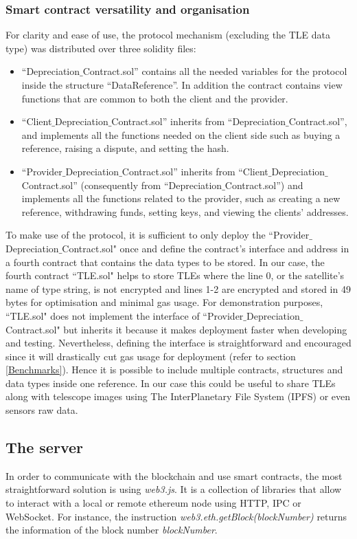 \documentclass[conference]{IEEEtran}
\begin{document}
\subsubsection{Smart contract versatility and organisation} 
For clarity and ease of use, the protocol mechanism (excluding the TLE data type) was distributed over three solidity files:
\begin{itemize}
    \item {``Depreciation$\_$Contract.sol'' contains all the needed variables for the protocol inside the structure ``DataReference''. In addition the contract contains view functions that are common to both the client and the provider.}
    \item {``Client$\_$Depreciation$\_$Contract.sol'' inherits from ``Depreciation$\_$Contract.sol'', and implements all the functions needed on the client side such as buying a reference, raising a dispute, and setting the hash.}
    \item {``Provider$\_$Depreciation$\_$Contract.sol'' inherits from ``Client$\_$Depreciation$\_$Contract.sol'' (consequently from ``Depreciation$\_$Contract.sol'') and implements all the functions related to the provider, such as creating a new reference, withdrawing funds, setting keys, and viewing the clients' addresses.}
\end{itemize}

To make use of the protocol, it is sufficient to only deploy the ``Provider$\_$Depreciation$\_$Contract.sol" once and define the contract's interface and address in a fourth contract that contains the data types to be stored. In our case, the fourth contract ``TLE.sol" helps to store TLEs where the line 0, or the satellite's name of type string, is not encrypted and lines 1-2 are encrypted and stored in 49 bytes for optimisation and minimal gas usage. For demonstration purposes, ``TLE.sol" does not implement the interface of ``Provider$\_$Depreciation$\_$Contract.sol" but inherits it because it makes deployment faster when developing and testing. Nevertheless, defining the interface is straightforward and encouraged since it will drastically cut gas usage for deployment (refer to section \ref{Benchmarks}). Hence it is possible to include multiple contracts, structures and data types inside one reference. In our case this could be useful to share TLEs along with telescope images using The InterPlanetary File System (IPFS) \cite{IPFS} or even sensors raw data.

\medskip

\subsection{The server}
In order to communicate with the blockchain and use smart contracts, the most straightforward solution is using \textit{web3.js}\cite{Web3js}. It is a collection of libraries that allow to interact with a local or remote ethereum node using HTTP, IPC or WebSocket. For instance, the instruction \textit{web3.eth.getBlock(blockNumber)} returns the information of the block number \textit{blockNumber}. 
\end{document}
